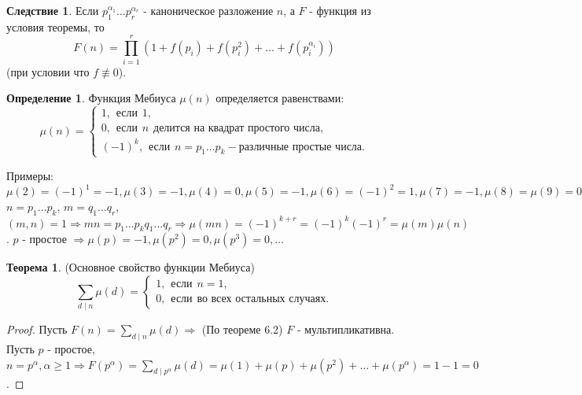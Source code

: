 \documentclass[a4paper, 12pt]{article}
\renewcommand{\div}{\mid}
\theoremstyle{definition}
\newtheorem{definition}{Определение}[section]
\newtheorem{theorem}{Теорема}[section]
\newtheorem*{consequense}{Следствие}
\begin{document}
    \begin{consequense}
        Если $p_1^{\alpha_1}\dots p_r^{\alpha_r}$ - каноническое разложение $n$, а $F$ - функция из условия теоремы, то
        $$F(n)=\prod\limits_{i=1}^{r}(1+f(p_i)+f(p_i^2)+\dots +f(p_i^{\alpha_i}))$$
        (при условии что $f\not\equiv 0$).
    \end{consequense}
    \begin{definition}
        Функция Мебиуса $\mu(n)$ определяется равенствами:
        \[\mu(n)=\begin{cases}
            1, \hspace{5pt} \text{если} \hspace{5pt} 1,\\
            0, \hspace{5pt} \text{если} \hspace{5pt} n \hspace{5pt} \text{делится на квадрат простого числа},\\
            (-1)^k,\hspace{5pt} \text{если} \hspace{5pt} n=p_1\dots p_k - \text{различные простые числа}.
        \end{cases}\]
    \end{definition} 
    Примеры: $\mu(2)=(-1)^1=-1, \mu(3)=-1, \mu(4)=0, \mu(5)=-1, \mu(6)=(-1)^2=1, \mu(7)=-1, \mu(8)=\mu(9)=0, \mu(10)=(-1)^2=1$
    $n=p_1\dots p_k$, $m=q_1\dots q_r$, $(m,n)=1\Rightarrow mn=p_1\dots p_kq_1\dots q_r \Rightarrow \mu(mn)=(-1)^{k+r}=(-1)^k(-1)^r=\mu(m)\mu(n)$.
    $p$ - простое $\Rightarrow \mu(p)=-1, \mu(p^2)=0, \mu(p^3)=0, \dots$
    \begin{theorem}
        (Основное свойство функции Мебиуса) \label{th6.3}
        \[\sum\limits_{d\div n}\mu(d)=\begin{cases}
            1, \hspace{5pt} \text{если} \hspace{5pt} n=1,\\
            0, \hspace{5pt} \text{если} \hspace{5pt} \text{во всех остальных случаях}.
        \end{cases}\]
    \end{theorem} 
    \begin{proof}
        Пусть $F(n)=\sum\limits_{d\div n}\mu(d)\Rightarrow$ (По теореме 6.2) $F$ - мультипликативна. Пусть $p$ - простое, $n=p^{\alpha}, \alpha\geq 1 \Rightarrow F(p^{\alpha})=\sum\limits_{d\div p^{\alpha}}\mu(d)=\mu(1)+\mu(p)+\mu(p^2)+\dots +\mu(p^{\alpha})=1-1=0$.
    \end{proof}
\end{document}
